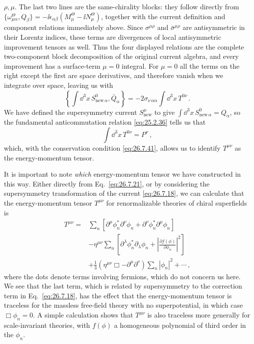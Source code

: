 \(\rho,\mu\).  The last two lines are the same-chirality blocks: they follow
directly from
\(\{\omega_{\mu\alpha}^\Theta,Q_\beta\}
=-\ii\epsilon_{\alpha\beta}(M_\mu^\Theta-\ii N_\mu^\Theta)\), together with
the current definition and component relations immediately above.  Since
\(\sigma^{\mu\rho}\) and
\(\bar\sigma^{\mu\rho}\) are antisymmetric in their Lorentz indices, these
terms are divergences of local antisymmetric improvement tensors as well.
Thus the four displayed relations are the complete two-component block
decomposition of the original current algebra, and every improvement has a
surface-term \(\mu=0\) integral.
For \(\mu=0\) all the terms on the right except the first are space
derivatives, and therefore vanish when we integrate over space, leaving us
with
\begin{equation}
  \left\{
    \int \dd^3x\,S_{\mathrm{new}\,\alpha}^0,\bar Q_{\dot\alpha}
  \right\}
  =-2\sigma_{\nu\,\alpha\dot\alpha}
    \int \dd^3x\,T^{0\nu}\,.
  \tag{26.7.46}\label{eq:26.7.46}
\end{equation}
We have defined the supersymmetry current \(S_{\mathrm{new}}^\mu\) to give
\(\int \dd^3x\,S_{\mathrm{new}\,\alpha}^0=Q_\alpha\), so the fundamental anticommutation
relation \eqref{eq:25.2.36} tells us that
\begin{equation}
  \int \dd^3x\,T^{0\nu}=P^\nu\,,
  \tag{26.7.47}\label{eq:26.7.47}
\end{equation}
which, with the conservation condition \eqref{eq:26.7.41}, allows us to
identify \(T^{\mu\nu}\) as the energy-momentum tensor.

It is important to note \emph{which} energy-momentum tensor we have
constructed in this way. Either directly from Eq.~\eqref{eq:26.7.21}, or by
considering the supersymmetry transformation of the current
\eqref{eq:26.7.18}, we can calculate that the energy-momentum tensor
\(T^{\mu\nu}\) for renormalizable theories of chiral superfields is
\begin{equation}
  \begin{aligned}
  T^{\mu\nu}
  ={}&\sum_n\left[
       \partial^\mu\phi_n^*\partial^\nu\phi_n
       +\partial^\nu\phi_n^*\partial^\mu\phi_n
      \right]
  \\
   &-\eta^{\mu\nu}\sum_n\left[
       \partial^\lambda\phi_n^*\partial_\lambda\phi_n
       +\left|
          \frac{\partial f(\phi)}{\partial\phi_n}
        \right|^2
      \right]
  \\
   &+\frac13
    (\eta^{\mu\nu}\Box-\partial^\mu\partial^\nu)
    \sum_n|\phi_n|^2+\cdots\,,
  \end{aligned}
  \tag{26.7.48}\label{eq:26.7.48}
\end{equation}
where the dots denote terms involving fermions, which do not concern us here.
We see that the last term, which is related by supersymmetry to the correction
term in Eq.~\eqref{eq:26.7.18}, has the effect that the energy-momentum
tensor is traceless for the massless free-field theory with no
superpotential, in which case \(\Box\phi_n=0\). A simple calculation shows
that \(T^{\mu\nu}\) is also traceless more generally for scale-invariant
theories, with \(f(\phi)\) a homogeneous polynomial of third order in the
\(\phi_n\).

